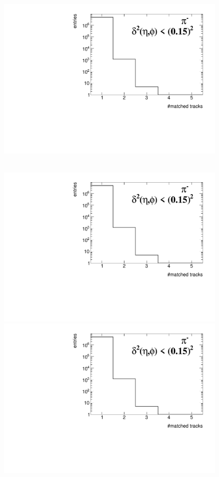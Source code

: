 \begin{figure}[h!]
{		\includegraphics[width=\linewidth,page=23]{graphics/eff/trackSplitting_QualityEtaPhiCD.pdf}\\
	}~
	\parbox{0.48\textwidth}{
		\centering
		\includegraphics[width=\linewidth,page=24]{graphics/eff/trackSplitting_QualityEtaPhiCD.pdf}\\
		\includegraphics[width=\linewidth,page=25]{graphics/eff/trackSplitting_QualityEtaPhiCD.pdf}\\
}
\end{figure}
